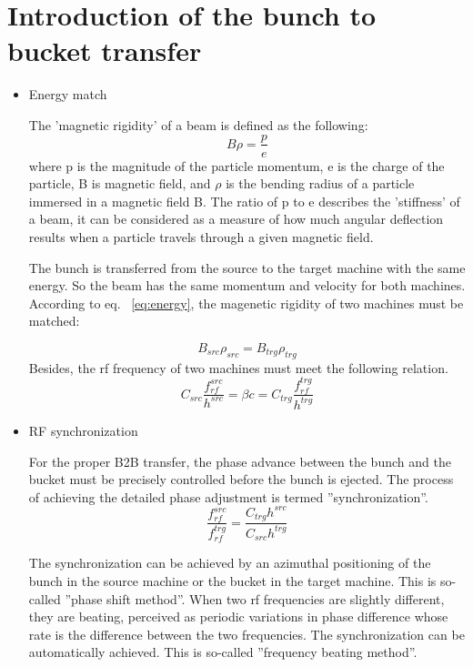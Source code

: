 \section{Introduction of the bunch to bucket transfer}

\begin{itemize}
\item Energy match

The 'magnetic rigidity' of a beam is defined as the following:
\begin{equation}
	\label{eq:energy}
	B\rho =\frac{p}{e}
\end{equation}
where p is the magnitude of the particle momentum, e is the charge of the particle, B is magnetic field, and $\rho$ is the bending radius of a particle immersed in a magnetic field B. The ratio of p to e describes the 'stiffness’ of a beam, it can be considered as a measure of how much angular deflection results when a particle travels through a given magnetic field.

The bunch is transferred from the source to the target machine with the same energy. So the beam has the same momentum and velocity for both machines. According to eq. ~\ref{eq:energy}, the magenetic rigidity of two machines must be matched:

\begin{equation}
	\label{eq:rigidity}
	B_{src}\rho_{src} =B_{trg}\rho_{trg}
\end{equation}
Besides, the rf frequency of two machines must meet the following relation.
\begin{equation}
	\label{eq:velocity}
	C_{src}\frac{f_{rf}^{src}}{h^{src}} = \beta c=C_{trg}\frac{f_{rf}^{trg}}{h^{trg}}
\end{equation}

\item RF synchronization

For the proper B2B transfer, the phase advance between the bunch and the bucket must be precisely controlled before the bunch is ejected. The process of achieving the detailed phase adjustment is termed ''synchronization''. 
\begin{equation}
	\label{eq:rf_frequency}
	\frac{f_{rf}^{src}}{f_{rf}^{trg}} = \frac{C_{trg}h^{src}}{C_{src}h^{trg}}
\end{equation}

The synchronization can be achieved by an azimuthal positioning of the bunch in the source machine or the bucket in the target machine. This is so-called ''phase shift method''. When two rf frequencies are slightly different, they are beating, perceived as periodic variations in phase difference whose rate is the difference between the two frequencies. The synchronization can be automatically achieved. This is so-called ''frequency beating method''.


\end{itemize}

